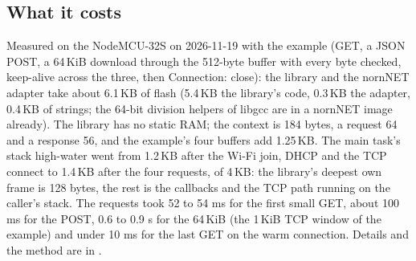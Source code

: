 \subsection{What it costs}

Measured on the NodeMCU-32S on 2026-11-19 with the  example (GET, a JSON
POST, a 64\,KiB download through the 512-byte buffer with every byte checked, keep-alive
across the three, then Connection: close): the library and the nornNET adapter take
about 6.1\,KB of flash (5.4\,KB the library's code, 0.3\,KB the adapter, 0.4\,KB of
strings; the 64-bit division helpers of libgcc are in a nornNET image already). The
library has no static RAM; the context is 184 bytes, a request 64 and a response 56, and
the example's four buffers add 1.25\,KB. The main task's stack high-water went from
1.2\,KB after the Wi-Fi join, DHCP and the TCP connect to 1.4\,KB after the four
requests, of 4\,KB: the library's deepest own frame is 128 bytes, the rest is the
callbacks and the TCP path running on the caller's stack. The requests took 52 to 54 ms
for the first small GET, about 100 ms for the POST, 0.6 to 0.9 s for the 64\,KiB (the
1\,KiB TCP window of the example) and under 10 ms for the last GET on the warm
connection. Details and the method are in .
